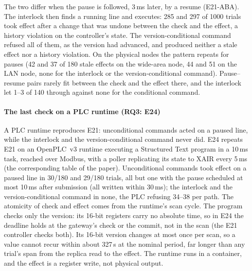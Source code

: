 \documentclass[11pt]{article}
\begin{document}
The two differ when the pause is followed, 3\,ms later, by a resume (E21-ABA). The interlock then finds a running line and executes: 285 and 297 of 1000 trials took effect after a change that was undone between the check and the effect, a history violation on the controller's state. The version-conditional command refused all of them, as the version had advanced, and produced neither a stale effect nor a history violation. On the physical nodes the pattern repeats for pauses (42 and 37 of 180 stale effects on the wide-area node, 44 and 51 on the LAN node, none for the interlock or the version-conditional command). Pause--resume pairs rarely fit between the check and the effect there, and the interlock let 1--3 of 140 through against none for the conditional command.

\paragraph{The last check on a PLC runtime (RQ3: E24)}
A PLC runtime reproduces E21: unconditional commands acted on a paused line, while the interlock and the version-conditional command never did. E24 repeats E21 on an OpenPLC~v3 runtime executing a Structured Text program in a 10\,ms task, reached over Modbus, with a poller replicating its state to XAIR every 5\,ms (the corresponding table of the paper). Unconditional commands took effect on a paused line in 30/180 and 29/180 trials, all but one with the pause scheduled at most 10\,ms after submission (all written within 30\,ms); the interlock and the version-conditional command in none, the PLC refusing 34--38 per path. The atomicity of check and effect comes from the runtime's scan cycle. The program checks only the version: its 16-bit registers carry no absolute time, so in E24 the deadline holds at the gateway's check or the commit, not in the scan (the E21 controller checks both). Its 16-bit version changes at most once per scan, so a value cannot recur within about 327\,s at the nominal period, far longer than any trial's span from the replica read to the effect. The runtime runs in a container, and the effect is a register write, not physical output.
\end{document}
